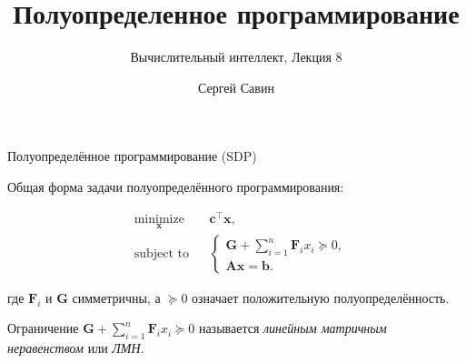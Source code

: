 \documentclass{beamer}
\title{Полуопределенное программирование}
\subtitle{Вычислительный интеллект, Лекция 8}
\author{Сергей Савин}
\date{\mydate}
\begin{document}
\maketitle


%


\begin{frame}{Полуопределённое программирование (SDP)}
	\begin{flushleft}
		
		Общая форма задачи полуопределённого программирования:
		
		\begin{equation}
			\begin{aligned}
				& \underset{\mathbf{x}}{\text{minimize}}
				& & \mathbf{c}^\top\mathbf{x}, \\
				& \text{subject to}
				& & \begin{cases}
					\mathbf{G} + \sum\limits_{i=1}^n \mathbf{F}_i x_i \succeq 0, \\
					\mathbf{A}\mathbf{x} = \mathbf{b}.
				\end{cases}
			\end{aligned}
		\end{equation}
		
		где $\mathbf{F}_i $ и $\mathbf{G}$ симметричны, а $\succeq 0$ означает положительную полуопределённость.
		
		\bigskip
		
		Ограничение $\mathbf{G} + \sum\limits_{i=1}^n \mathbf{F}_i x_i \succeq 0$ называется \emph{линейным матричным неравенством} или \emph{ЛМН}.
		
	\end{flushleft}
\end{frame}
\end{document}
